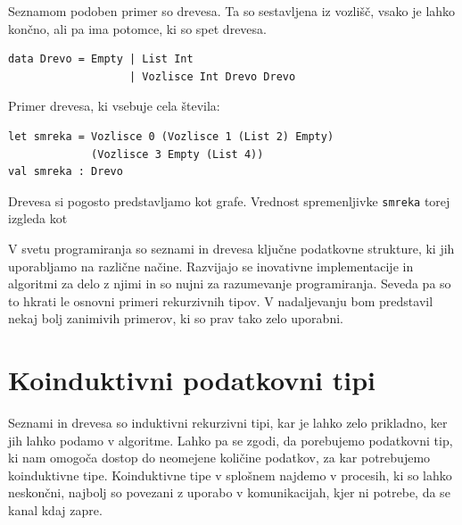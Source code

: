 \documentclass[a4paper,12pt,openright]{book}
\begin{document}
Seznamom podoben primer so drevesa. Ta so sestavljena iz vozlišč, vsako je lahko končno, ali pa ima potomce, ki so spet drevesa.
\begin{lstlisting}
data Drevo = Empty | List Int 
                   | Vozlisce Int Drevo Drevo
\end{lstlisting}
Primer drevesa, ki vsebuje cela števila:
\begin{lstlisting}
let smreka = Vozlisce 0 (Vozlisce 1 (List 2) Empty)
             (Vozlisce 3 Empty (List 4))
val smreka : Drevo
\end{lstlisting}
Drevesa si pogosto predstavljamo kot grafe. Vrednost spremenljivke \lstinline{smreka} torej izgleda kot
\begin{center} 
\end{center}

V svetu programiranja so seznami in drevesa ključne podatkovne strukture, ki jih uporabljamo na različne načine. Razvijajo se inovativne implementacije in algoritmi za delo z njimi in so nujni za razumevanje programiranja.
Seveda pa so to hkrati le osnovni primeri rekurzivnih tipov. V nadaljevanju bom predstavil nekaj bolj zanimivih primerov, ki so prav tako zelo uporabni.

\section{Koinduktivni podatkovni tipi}
Seznami in drevesa so induktivni rekurzivni tipi, kar je lahko zelo prikladno, ker jih lahko podamo v algoritme. Lahko pa se zgodi, da porebujemo podatkovni tip, ki nam omogoča dostop do 
neomejene količine podatkov, za kar potrebujemo koinduktivne tipe. Koinduktivne tipe v splošnem najdemo v procesih, ki so lahko neskončni, najbolj so povezani z uporabo v komunikacijah, kjer ni potrebe, da se kanal kdaj zapre.
\end{document}
